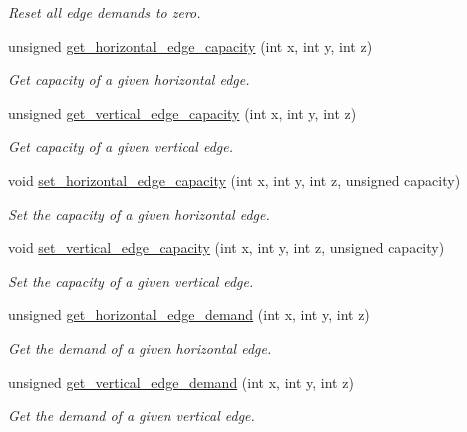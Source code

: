 \begin{DoxyCompactItemize}
\begin{DoxyCompactList}\small\item\em Reset all edge demands to zero. \end{DoxyCompactList}\item 
unsigned \hyperlink{classophidian_1_1routing_1_1grid__3d_aec3994ff6bc03879ebae0bc306a35934}{get\-\_\-horizontal\-\_\-edge\-\_\-capacity} (int x, int y, int z)
\begin{DoxyCompactList}\small\item\em Get capacity of a given horizontal edge. \end{DoxyCompactList}\item 
unsigned \hyperlink{classophidian_1_1routing_1_1grid__3d_a5f6810be39f00c594364c4dc1948f772}{get\-\_\-vertical\-\_\-edge\-\_\-capacity} (int x, int y, int z)
\begin{DoxyCompactList}\small\item\em Get capacity of a given vertical edge. \end{DoxyCompactList}\item 
void \hyperlink{classophidian_1_1routing_1_1grid__3d_a2d01680551e2aabb02ae5b9b7ec80b87}{set\-\_\-horizontal\-\_\-edge\-\_\-capacity} (int x, int y, int z, unsigned capacity)
\begin{DoxyCompactList}\small\item\em Set the capacity of a given horizontal edge. \end{DoxyCompactList}\item 
void \hyperlink{classophidian_1_1routing_1_1grid__3d_ac6696f679ac0da3c2af393d823c8dae5}{set\-\_\-vertical\-\_\-edge\-\_\-capacity} (int x, int y, int z, unsigned capacity)
\begin{DoxyCompactList}\small\item\em Set the capacity of a given vertical edge. \end{DoxyCompactList}\item 
unsigned \hyperlink{classophidian_1_1routing_1_1grid__3d_a36c8a66b3ea2de62f73ac8e168d83d71}{get\-\_\-horizontal\-\_\-edge\-\_\-demand} (int x, int y, int z)
\begin{DoxyCompactList}\small\item\em Get the demand of a given horizontal edge. \end{DoxyCompactList}\item 
unsigned \hyperlink{classophidian_1_1routing_1_1grid__3d_a35e23bbb902a374c64785577447a0a3c}{get\-\_\-vertical\-\_\-edge\-\_\-demand} (int x, int y, int z)
\begin{DoxyCompactList}\small\item\em Get the demand of a given vertical edge. \end{DoxyCompactList}\item 

\end{DoxyCompactItemize}
